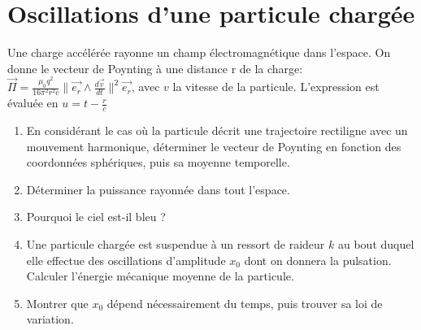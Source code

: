 \documentclass{article}
\begin{document}
\section{Oscillations d'une particule chargée}
Une charge accélérée rayonne un champ électromagnétique dans l'espace. On donne le vecteur de Poynting à une distance r de la charge: $\vec{\Pi} = \frac{\mu_0 q^2}{16\pi ^2 r^2 c} \|\vec{e_r} \wedge \frac{d\vec{v}}{dt}\|^2\vec{e_r}$, avec $v$ la vitesse de la particule. L'expression est évaluée en $u=t-\frac{r}{c}$
\begin{enumerate}
    \item En considérant le cas où la particule décrit une trajectoire rectiligne avec un mouvement harmonique, déterminer le vecteur de Poynting en fonction des coordonnées sphériques, puis sa moyenne temporelle. 
    \item Déterminer la puissance rayonnée dans tout l'espace. 
    \item Pourquoi le ciel est-il bleu ?
    \item Une particule chargée est suspendue à un ressort de raideur $k$ au bout duquel elle effectue des oscillations d'amplitude $x_0$ dont on donnera la pulsation. Calculer l'énergie mécanique moyenne de la particule. 
    \item Montrer que $x_0$ dépend nécessairement du temps, puis trouver sa loi de variation. 
\end{enumerate}
\end{document}
